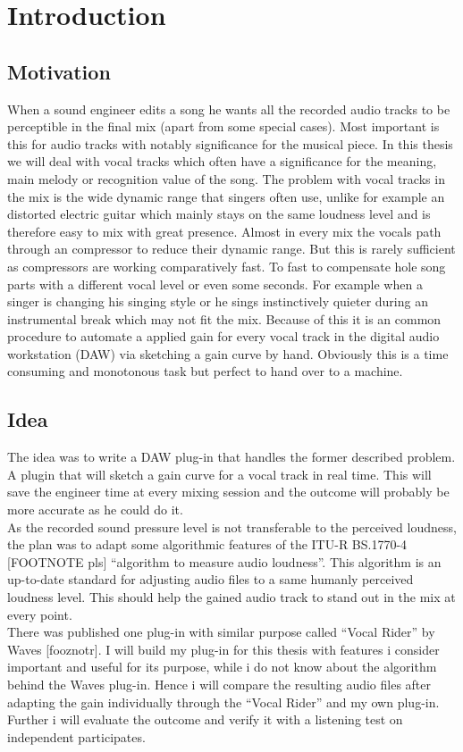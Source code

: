 \chapter{Introduction}
\label{chapter:introduction}

\section{Motivation}

When a sound engineer edits a song he wants all the recorded audio tracks to be perceptible in the final mix (apart from some special cases). Most important is this for audio tracks with notably significance for the musical piece. In this thesis we will deal with vocal tracks which often have a significance for the meaning, main melody or recognition value of the song. The problem with vocal tracks in the mix is the wide dynamic range that singers often use, unlike for example an distorted electric guitar which mainly stays on the same loudness level and is therefore easy to mix with great presence. Almost in every mix the vocals path through an compressor to reduce their dynamic range. But this is rarely sufficient as compressors are working comparatively fast. To fast to compensate hole song parts with a different vocal level or even some seconds. For example when a singer is changing his singing style or he sings instinctively quieter during an instrumental break which may not fit the mix. Because of this it is an common procedure to automate a applied gain for every vocal track in the digital audio workstation (DAW) via sketching a gain curve by hand. Obviously this is a time consuming and monotonous task but perfect to hand over to a machine.\\

\section{Idea}

The idea was to write a DAW plug-in that handles the former described problem. A plugin that will sketch a gain curve for a vocal track in real time. This will save the engineer time at every mixing session and the outcome will probably be more accurate as he could do it.\\
As the recorded sound pressure level is not transferable to the perceived loudness, the plan was to adapt some algorithmic features of the ITU-R BS.1770-4 [FOOTNOTE pls] “algorithm to measure audio loudness”. This algorithm is an up-to-date standard for adjusting audio files to a same humanly perceived loudness level. This should help the gained audio track to stand out in the mix at every point.\\
There was published one plug-in with similar purpose called “Vocal Rider” by Waves [fooznotr]. 
I will build my plug-in for this thesis with features i consider important and useful for its purpose, while i do not know about the algorithm behind the Waves plug-in. Hence i will compare the resulting audio files after adapting the gain individually through the “Vocal Rider” and my own plug-in. Further i will evaluate the outcome and verify it with a listening test on independent participates.\\


